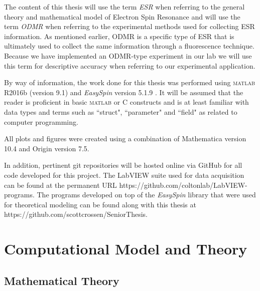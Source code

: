 \documentclass[oneside, astronomy, noacknowlegments]{BYUPhys}
\begin{document}
The content of this thesis will use the term \textit{ESR} when referring to the general theory and mathematical model of Electron Spin Resonance and will use the term \textit{ODMR} when referring to the experimental methods used for collecting ESR information. As mentioned earlier, ODMR is a specific type of ESR that is ultimately used to collect the same information through a fluorescence technique. Because we have implemented an ODMR-type experiment in our lab we will use this term for descriptive accuracy when referring to our experimental application.

By way of information, the work done for this thesis was performed using \textsc{matlab} R2016b (version 9.1) and \textit{EasySpin} version 5.1.9 . It will be assumed that the reader is proficient in basic \textsc{matlab} or C constructs and is at least familiar with data types and terms such as ``struct", ``parameter" and ``field" as related to computer programming.

All plots and figures were created using a combination of Mathematica version 10.4 and Origin version 7.5.

In addition, pertinent git repositories will be hosted online via GitHub for all code developed for this project. The LabVIEW suite used for data acquisition can be found at the permanent URL https://github.com/coltonlab/LabVIEW-programs. The programs developed on top of the \textit{EasySpin} library that were used for theoretical modeling can be found along with this thesis at https://github.com/scottcrossen/SeniorThesis.










\chapter{Computational Model and Theory}

\section{Mathematical Theory}
\end{document}
